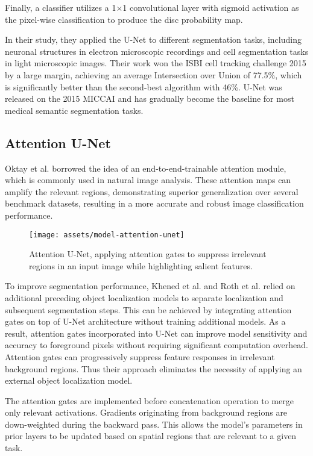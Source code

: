 \documentclass[conference]{IEEEtran}
\begin{document}
Finally, a classifier utilizes a 1×1 convolutional layer with sigmoid activation as the pixel-wise classification to produce the disc probability map.

In their study, they applied the U-Net to different segmentation tasks, including neuronal structures in electron microscopic recordings and cell segmentation tasks in light microscopic images. Their work won the ISBI cell tracking challenge 2015 by a large margin, achieving an average Intersection over Union of 77.5\%, which is significantly better than the second-best algorithm with 46\%. U-Net was released on the 2015 MICCAI and has gradually become the baseline for most medical semantic segmentation tasks.

\subsection{Attention U-Net}

Oktay et al. borrowed the idea of an end-to-end-trainable attention module\cite{jetley2018learn}, which is commonly used in natural image analysis. These attention maps can amplify the relevant regions, demonstrating superior generalization over several benchmark datasets, resulting in a more accurate and robust image classification performance.

\begin{figure}[h]
\centerline{\texttt{[image: assets/model-attention-unet]}}
\caption{Attention U-Net, applying attention gates to suppress irrelevant regions in an input image while highlighting salient features.}
\label{fig_unet_attn}
\end{figure}

To improve segmentation performance, Khened et al.\cite{khened2019fully} and Roth et al.\cite{roth2018spatial} relied on additional preceding object localization models to separate localization and subsequent segmentation steps. This can be achieved by integrating attention gates on top of U-Net architecture without training additional models. As a result, attention gates incorporated into U-Net can improve model sensitivity and accuracy to foreground pixels without requiring significant computation overhead. Attention gates can progressively suppress feature responses in irrelevant background regions. Thus their approach eliminates the necessity of applying an external object localization model.

The attention gates are implemented before concatenation operation to merge only relevant activations. Gradients originating from background regions are down-weighted during the backward pass. This allows the model's parameters in prior layers to be updated based on spatial regions that are relevant to a given task.
\end{document}
